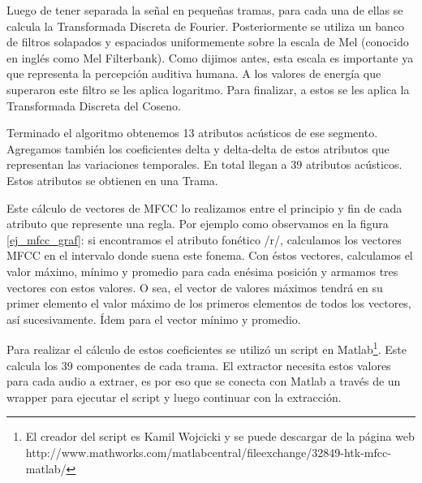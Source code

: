 Luego de tener separada la señal en pequeñas tramas, para cada una de ellas se calcula la Transformada Discreta de Fourier. Posteriormente se utiliza un banco de filtros solapados y espaciados uniformemente sobre la escala de Mel (conocido en inglés como Mel Filterbank). Como dijimos antes, esta escala es importante ya que representa la percepción auditiva humana. A los valores de energía que superaron este filtro se les aplica logaritmo. Para finalizar, a estos se les aplica la Transformada Discreta del Coseno.


Terminado el algoritmo obtenemos 13 atributos acústicos de ese segmento. Agregamos también los coeficientes delta y delta-delta de estos atributos que representan las variaciones temporales. En total llegan a 39 atributos acústicos. Estos atributos se obtienen en una Trama.

Este cálculo de vectores de MFCC lo realizamos entre el principio y fin de cada atributo que represente una regla. Por ejemplo como observamos en la figura \ref{ej_mfcc_graf}: si encontramos el atributo fonético /r/, calculamos los vectores MFCC en el intervalo donde suena este fonema. Con éstos vectores, calculamos el valor máximo, mínimo y promedio para cada enésima posición y armamos tres vectores con estos valores. O sea, el vector de valores máximos tendrá en su primer elemento el valor máximo de los primeros elementos de todos los vectores, así sucesivamente. Ídem para el vector mínimo y promedio. 

Para realizar el cálculo de estos coeficientes se utilizó un script en Matlab\footnote{El creador del script es Kamil Wojcicki y se puede descargar de la página web http://www.mathworks.com/matlabcentral/fileexchange/32849-htk-mfcc-matlab/}. Este calcula los 39 componentes de cada trama. El extractor necesita estos valores para cada audio a extraer, es por eso que se conecta con Matlab a través de un wrapper para ejecutar el script y luego continuar con la extracción.

